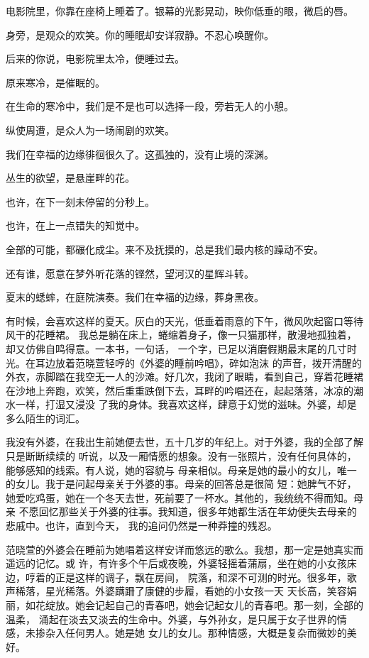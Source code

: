 		电影院里，你靠在座椅上睡着了。银幕的光影晃动，映你低垂的眼，微启的唇。\par
		身旁，是观众的欢笑。你的睡眠却安详寂静。不忍心唤醒你。\par
		后来的你说，电影院里太冷，便睡过去。\par
		原来寒冷，是催眠的。\par
		在生命的寒冷中，我们是不是也可以选择一段，旁若无人的小憩。\par
		纵使周遭，是众人为一场闹剧的欢笑。


		我们在幸福的边缘徘徊很久了。这孤独的，没有止境的深渊。

		丛生的欲望，是悬崖畔的花。\par
		也许，在下一刻未停留的分秒上。\par
		也许，在上一点错失的知觉中。\par
		全部的可能，都碾化成尘。来不及抚摸的，总是我们最内核的躁动不安。

		还有谁，愿意在梦外听花落的铿然，望河汉的星辉斗转。

		夏末的蟋蟀，在庭院演奏。我们在幸福的边缘，葬身黑夜。

	\endwriting



		有时候，会喜欢这样的夏天。灰白的天光，低垂着雨意的下午，微风吹起窗口等待风干的花睡裙。
	我总是躺在床上，蜷缩着身子，像一只猫那样，散漫地孤独着，却又仿佛自鸣得意。一本书，一句话，
	一个字，已足以消磨假期最末尾的几寸时光。在耳边放着范晓萱轻哼的《外婆的睡前吟唱》，碎如泡沫
	的声音，拨开清醒的外衣，赤脚踏在我空无一人的沙滩。好几次，我闭了眼睛，看到自己，穿着花睡裙
	在沙地上奔跑，欢笑，然后重重跌倒下去，耳畔的吟唱还在，起起落落，冰凉的潮水一样，打湿又浸没
	了我的身体。我喜欢这样，肆意于幻觉的滋味。外婆，却是多么陌生的词汇。

		我没有外婆，在我出生前她便去世，五十几岁的年纪上。对于外婆，我的全部了解只是断断续续的
	听说，以及一厢情愿的想象。没有一张照片，没有任何具体的，能够感知的线索。有人说，她的容貌与
	母亲相似。母亲是她的最小的女儿，唯一的女儿。我于是问起母亲关于外婆的事。母亲的回答总是很简
	短：她脾气不好，她爱吃鸡蛋，她在一个冬天去世，死前要了一杯水。其他的，我统统不得而知。母亲
	不愿回忆那些关于外婆的往事。我知道，很多年她都生活在年幼便失去母亲的悲戚中。也许，直到今天，
	我的追问仍然是一种莽撞的残忍。

		范晓萱的外婆会在睡前为她唱着这样安详而悠远的歌么。我想，那一定是她真实而遥远的记忆。或
	许，有许多个午后或夜晚，外婆轻摇着蒲扇，坐在她的小女孩床边，哼着的正是这样的调子，飘在房间，
	院落，和深不可测的时光。很多年，歌声稀落，星光稀落。外婆蹒跚了康健的步履，看她的小女孩一天
	天长高，笑容娟丽，如花绽放。她会记起自己的青春吧，她会记起女儿的青春吧。那一刻，全部的温柔，
	涌起在淡去又淡去的生命中。外婆，与外孙女，是只属于女子世界的情感，未掺杂入任何男人。她是她
	女儿的女儿。那种情感，大概是复杂而微妙的美好。


